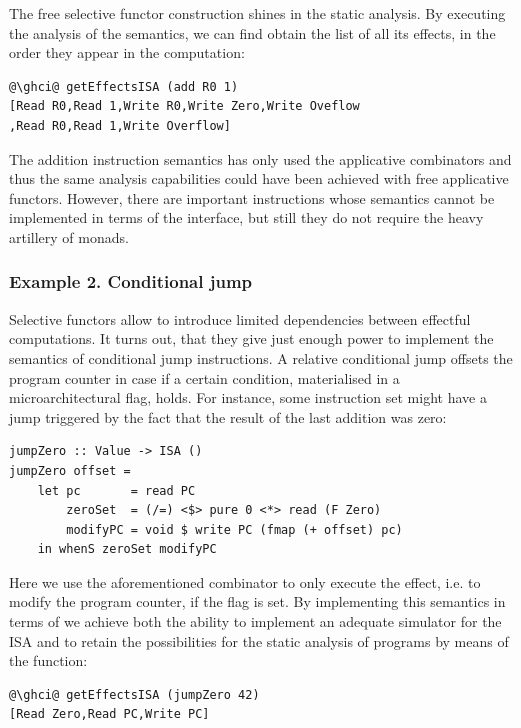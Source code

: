 The free selective functor construction shines in the static analysis. By executing
the analysis of the  semantics, we can find obtain the list of all its effects,
in the order they appear in the computation:
\begin{verbatim}
@\ghci@ getEffectsISA (add R0 1)
[Read R0,Read 1,Write R0,Write Zero,Write Oveflow
,Read R0,Read 1,Write Overflow]
\end{verbatim}

The addition instruction semantics has only used the applicative combinators and thus
the same analysis capabilities could have been achieved with free applicative functors.
However, there are important instructions whose semantics cannot be implemented in terms
of the  interface, but still they do not require the heavy artillery of monads.

\subsubsection{\textbf{Example 2. Conditional jump}}

Selective functors allow to introduce limited dependencies between effectful computations.
It turns out, that they give just enough power to implement the semantics of conditional
jump instructions. A relative conditional jump offsets the program counter in case if a
certain condition, materialised in a microarchitectural flag, holds. For instance, some
instruction set might have a jump triggered by the fact that the result of the last addition
was zero:

\begin{verbatim}
jumpZero :: Value -> ISA ()
jumpZero offset =
    let pc       = read PC
        zeroSet  = (/=) <$> pure 0 <*> read (F Zero)
        modifyPC = void $ write PC (fmap (+ offset) pc)
    in whenS zeroSet modifyPC
\end{verbatim}

Here we use the aforementioned  combinator to only execute the effect, i.e.
to modify the program counter, if the flag is set. By implementing this semantics in terms of
 we achieve both the ability to implement an adequate simulator for the ISA and
to retain the possibilities for the static analysis of programs by means of the  function:

\begin{verbatim}
@\ghci@ getEffectsISA (jumpZero 42)
[Read Zero,Read PC,Write PC]
\end{verbatim}


